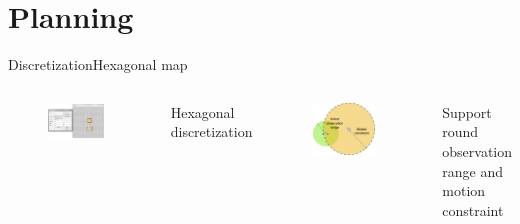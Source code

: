\section{Planning}

\begin{frame}{Discretization}{Hexagonal map}

\begin{columns}
\begin{figure}
\centering
\includegraphics[width = 0.9\textwidth]{./screenshot/discretization.png}
\end{figure}

\begin{minipage}{\textwidth}
Hexagonal discretization
\begin{figure}
\centering
\includegraphics[width = 0.9\textwidth]{./figure/wingman}
\end{figure}
Support round observation range and motion constraint
\end{minipage}
\end{columns}

\end{frame}

